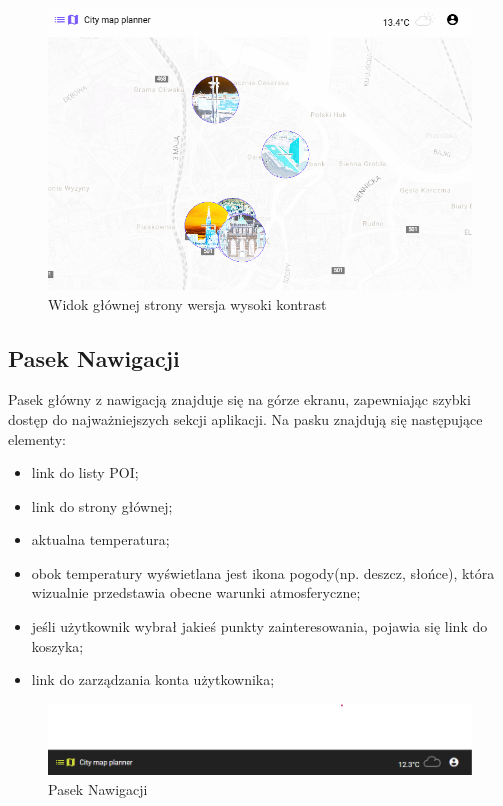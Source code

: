         \begin{figure}[H]
            \centering
            \includegraphics[width=1\textwidth]{attachments/mapawidok-high-contrast}
            \caption{Widok głównej strony wersja wysoki kontrast}
            \label{fig:mapawidok2}
            \end{figure}

\subsection{Pasek Nawigacji}
\label{sec:pasek-nawigacji}
Pasek główny z nawigacją znajduje się na górze ekranu, zapewniając szybki dostęp do najważniejszych sekcji aplikacji. Na pasku znajdują się następujące elementy:
\begin{itemize}
    \item link do listy POI;
    \item link do strony głównej;
    \item aktualna temperatura;
    \item obok temperatury wyświetlana jest ikona pogody(np. deszcz, słońce), która wizualnie przedstawia obecne warunki atmosferyczne;
    \item jeśli użytkownik wybrał jakieś punkty zainteresowania, pojawia się link do koszyka;
    \item link do zarządzania konta użytkownika;
\end{itemize}
\begin{figure}[H]
    \centering
    \includegraphics[width=1\textwidth]{attachments/nav-baner}
    \caption{Pasek Nawigacji}
    \label{fig:pasek-nawigacji}
\end{figure}

